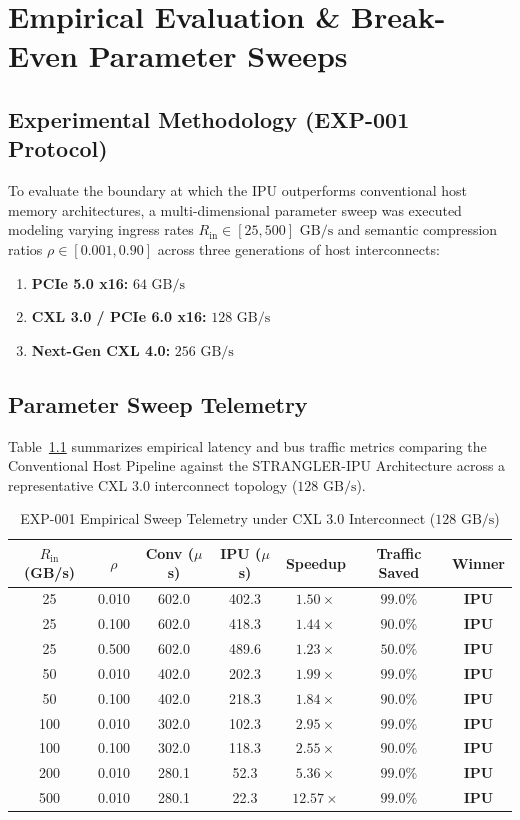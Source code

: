 \chapter{Empirical Evaluation \& Break-Even Parameter Sweeps}
\label{chap:results}

\section{Experimental Methodology (EXP-001 Protocol)}
To evaluate the boundary at which the IPU outperforms conventional host memory architectures, a multi-dimensional parameter sweep was executed modeling varying ingress rates $R_{\text{in}} \in [25, 500]\text{ GB/s}$ and semantic compression ratios $\rho \in [0.001, 0.90]$ across three generations of host interconnects:
\begin{enumerate}
    \item \textbf{PCIe 5.0 x16:} $64\text{ GB/s}$
    \item \textbf{CXL 3.0 / PCIe 6.0 x16:} $128\text{ GB/s}$
    \item \textbf{Next-Gen CXL 4.0:} $256\text{ GB/s}$
\end{enumerate}

\section{Parameter Sweep Telemetry}
Table~\ref{tab:sweep_results} summarizes empirical latency and bus traffic metrics comparing the Conventional Host Pipeline against the STRANGLER-IPU Architecture across a representative CXL 3.0 interconnect topology ($128\text{ GB/s}$).

\begin{table}[htbp]
\centering
\caption{EXP-001 Empirical Sweep Telemetry under CXL 3.0 Interconnect ($128\text{ GB/s}$)}
\label{tab:sweep_results}
\begin{tabular}{ccccccc}
\hline
\textbf{$R_{\text{in}}$ (GB/s)} & \textbf{$\rho$} & \textbf{Conv ($\mu$s)} & \textbf{IPU ($\mu$s)} & \textbf{Speedup} & \textbf{Traffic Saved} & \textbf{Winner} \\
\hline
25  & 0.010 & 602.0 & 402.3 & $1.50\times$  & $99.0\%$ & \textbf{IPU} \\
25  & 0.100 & 602.0 & 418.3 & $1.44\times$  & $90.0\%$ & \textbf{IPU} \\
25  & 0.500 & 602.0 & 489.6 & $1.23\times$  & $50.0\%$ & \textbf{IPU} \\
50  & 0.010 & 402.0 & 202.3 & $1.99\times$  & $99.0\%$ & \textbf{IPU} \\
50  & 0.100 & 402.0 & 218.3 & $1.84\times$  & $90.0\%$ & \textbf{IPU} \\
100 & 0.010 & 302.0 & 102.3 & $2.95\times$  & $99.0\%$ & \textbf{IPU} \\
100 & 0.100 & 302.0 & 118.3 & $2.55\times$  & $90.0\%$ & \textbf{IPU} \\
200 & 0.010 & 280.1 & 52.3  & $5.36\times$  & $99.0\%$ & \textbf{IPU} \\
500 & 0.010 & 280.1 & 22.3  & $12.57\times$ & $99.0\%$ & \textbf{IPU} \\
\hline
\end{tabular}
\end{table}

